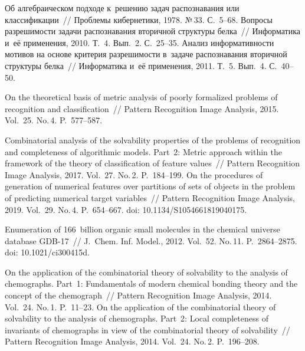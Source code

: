 \begin{multicols}{2}
\vspace*{-6pt}
     
{\small\frenchspacing
 {%
 \begin{thebibliography}{99}
 
 \vspace*{-2pt}
 
 Об алгебраическом подходе к~решению задач распознавания или 
классификации~// Проб\-ле\-мы кибернетики, 1978. №\,33. С.~5--68.
 Вопросы разрешимости задачи распознавания 
вторичной структуры белка~// Информатика и~её применения, 2010. Т.~4. Вып.~2. С.~25--35.
 Анализ ин\-фор\-ма\-тив\-ности мотивов на основе критерия 
разрешимости в~задаче распознавания вторичной структуры белка~// Информатика и~её 
применения, 2011. Т.~5. Вып.~4. С.~40--50.

 On the theoretical basis of metric analysis of poorly 
formalized problems of recognition and classification~// Pattern Recognition Image Analysis, 2015. 
Vol.~25. No.\,4. P.~577--587.

 Combinatorial analysis of the solvability properties of the 
problems of recognition and completeness of algorithmic models. Part~2: Metric approach within 
the framework of the theory of classification of feature values~// Pattern Recognition Image Analysis, 
2017. Vol.~27. No.\,2. P.~184--199.
 On the procedures of generation of numerical features over 
partitions of sets of objects in the problem of predicting numerical target variables~// Pattern 
Recognition  Image Analysis, 2019. Vol.~29. No.\,4. P.~654--667. doi: 10.1134/S1054661819040175.

 Enumeration of 166~billion organic 
small molecules in the chemical universe database GDB-17~// J.~Chem. Inf. Model., 2012. Vol.~52. 
No.\,11. P.~2864--2875. doi: 10.1021/ci300415d.

 On the application of the combinatorial theory of solvability 
to the analysis of chemographs. Part~1: Fundamentals of modern chemical bonding theory and the 
concept of the chemograph~// Pattern Recognition Image Analysis, 2014. Vol.~24. No.\,1.  
P.~11--23.
 On the application of the combinatorial theory of solvability 
to the analysis of chemographs. Part~2: Local completeness of invariants of chemographs in view 
of the combinatorial theory of solvability~// Pattern Recognition Image Analysis, 2014. Vol.~24. No.\,2. 
P.~196--208.


\end{thebibliography}}}
\end{multicols}
